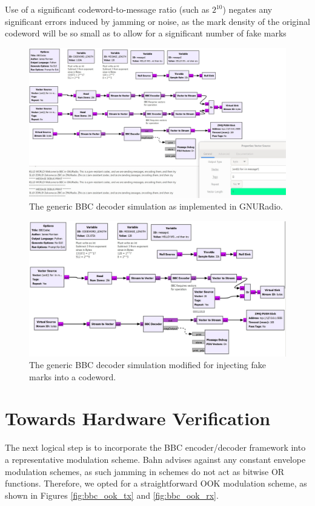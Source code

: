 \documentclass[conference]{IEEEtran}
\begin{document}
Use of a significant codeword-to-message ratio (such as $2^{10}$) negates any significant errors induced by jamming or noise, as the mark density of the original codeword will be so small as to allow for a significant number of fake marks 

\begin{figure}[h]
    \centering
    \includegraphics[scale=0.25]{./figures/GRCCodec_Multiple Messages_V2}
    \caption{The generic BBC decoder simulation as implemented in GNURadio. }
    \label{fig:bbc_sim}
\end{figure}

\begin{figure}[h]
    \centering
    \includegraphics[scale=0.25]{./figures/GRCCodec_Fake marks}
    \caption{The generic BBC decoder simulation modified for injecting fake marks into a codeword.}
    \label{fig:bbc_fake_news}
\end{figure}

\section{Towards Hardware Verification}
The next logical step is to incorporate the BBC encoder/decoder framework into a representative modulation scheme. Bahn \cite{thesis} advises against any constant envelope modulation schemes, as such jamming in schemes do not act as bitwise OR functions. Therefore, we opted for a straightforward OOK modulation scheme, as shown in Figures \ref{fig:bbc_ook_tx} and \ref{fig:bbc_ook_rx}. 
\end{document}
